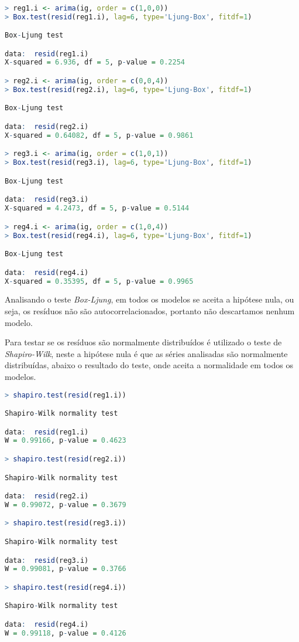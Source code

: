 \documentclass[a4paper,12pt,oneside,titlepage]{article}
\begin{document}
\begin{lstlisting}[language=R,caption={ADF}]

> reg1.i <- arima(ig, order = c(1,0,0))
> Box.test(resid(reg1.i), lag=6, type='Ljung-Box', fitdf=1)

Box-Ljung test

data:  resid(reg1.i)
X-squared = 6.936, df = 5, p-value = 0.2254

> reg2.i <- arima(ig, order = c(0,0,4))
> Box.test(resid(reg2.i), lag=6, type='Ljung-Box', fitdf=1)

Box-Ljung test

data:  resid(reg2.i)
X-squared = 0.64082, df = 5, p-value = 0.9861

> reg3.i <- arima(ig, order = c(1,0,1))
> Box.test(resid(reg3.i), lag=6, type='Ljung-Box', fitdf=1)

Box-Ljung test

data:  resid(reg3.i)
X-squared = 4.2473, df = 5, p-value = 0.5144

> reg4.i <- arima(ig, order = c(1,0,4))
> Box.test(resid(reg4.i), lag=6, type='Ljung-Box', fitdf=1)

Box-Ljung test

data:  resid(reg4.i)
X-squared = 0.35395, df = 5, p-value = 0.9965
\end{lstlisting}
 
Analisando o teste \textit{Box-Ljung}, em todos os modelos se aceita a hipótese nula, ou seja, os resíduos não são autocorrelacionados, portanto não descartamos nenhum modelo.

Para testar se os resíduos são normalmente distribuídos é utilizado o teste de \textit{Shapiro-Wilk}, neste a hipótese nula é que as séries analisadas são normalmente distribuídas, abaixo o resultado do teste, onde aceita a normalidade em todos os modelos. 

\begin{lstlisting}[language=R,caption={ADF}]
> shapiro.test(resid(reg1.i))

Shapiro-Wilk normality test

data:  resid(reg1.i)
W = 0.99166, p-value = 0.4623

> shapiro.test(resid(reg2.i))

Shapiro-Wilk normality test

data:  resid(reg2.i)
W = 0.99072, p-value = 0.3679

> shapiro.test(resid(reg3.i))

Shapiro-Wilk normality test

data:  resid(reg3.i)
W = 0.99081, p-value = 0.3766

> shapiro.test(resid(reg4.i))

Shapiro-Wilk normality test

data:  resid(reg4.i)
W = 0.99118, p-value = 0.4126

\end{lstlisting}
\end{document}
